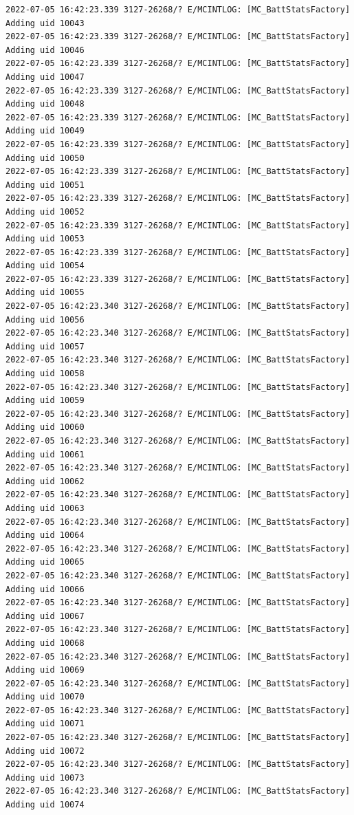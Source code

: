 \documentclass[a4paper,12pt]{book}
\begin{document}
\begin{lstlisting}
2022-07-05 16:42:23.339 3127-26268/? E/MCINTLOG: [MC_BattStatsFactory] Adding uid 10043
2022-07-05 16:42:23.339 3127-26268/? E/MCINTLOG: [MC_BattStatsFactory] Adding uid 10046
2022-07-05 16:42:23.339 3127-26268/? E/MCINTLOG: [MC_BattStatsFactory] Adding uid 10047
2022-07-05 16:42:23.339 3127-26268/? E/MCINTLOG: [MC_BattStatsFactory] Adding uid 10048
2022-07-05 16:42:23.339 3127-26268/? E/MCINTLOG: [MC_BattStatsFactory] Adding uid 10049
2022-07-05 16:42:23.339 3127-26268/? E/MCINTLOG: [MC_BattStatsFactory] Adding uid 10050
2022-07-05 16:42:23.339 3127-26268/? E/MCINTLOG: [MC_BattStatsFactory] Adding uid 10051
2022-07-05 16:42:23.339 3127-26268/? E/MCINTLOG: [MC_BattStatsFactory] Adding uid 10052
2022-07-05 16:42:23.339 3127-26268/? E/MCINTLOG: [MC_BattStatsFactory] Adding uid 10053
2022-07-05 16:42:23.339 3127-26268/? E/MCINTLOG: [MC_BattStatsFactory] Adding uid 10054
2022-07-05 16:42:23.339 3127-26268/? E/MCINTLOG: [MC_BattStatsFactory] Adding uid 10055
2022-07-05 16:42:23.340 3127-26268/? E/MCINTLOG: [MC_BattStatsFactory] Adding uid 10056
2022-07-05 16:42:23.340 3127-26268/? E/MCINTLOG: [MC_BattStatsFactory] Adding uid 10057
2022-07-05 16:42:23.340 3127-26268/? E/MCINTLOG: [MC_BattStatsFactory] Adding uid 10058
2022-07-05 16:42:23.340 3127-26268/? E/MCINTLOG: [MC_BattStatsFactory] Adding uid 10059
2022-07-05 16:42:23.340 3127-26268/? E/MCINTLOG: [MC_BattStatsFactory] Adding uid 10060
2022-07-05 16:42:23.340 3127-26268/? E/MCINTLOG: [MC_BattStatsFactory] Adding uid 10061
2022-07-05 16:42:23.340 3127-26268/? E/MCINTLOG: [MC_BattStatsFactory] Adding uid 10062
2022-07-05 16:42:23.340 3127-26268/? E/MCINTLOG: [MC_BattStatsFactory] Adding uid 10063
2022-07-05 16:42:23.340 3127-26268/? E/MCINTLOG: [MC_BattStatsFactory] Adding uid 10064
2022-07-05 16:42:23.340 3127-26268/? E/MCINTLOG: [MC_BattStatsFactory] Adding uid 10065
2022-07-05 16:42:23.340 3127-26268/? E/MCINTLOG: [MC_BattStatsFactory] Adding uid 10066
2022-07-05 16:42:23.340 3127-26268/? E/MCINTLOG: [MC_BattStatsFactory] Adding uid 10067
2022-07-05 16:42:23.340 3127-26268/? E/MCINTLOG: [MC_BattStatsFactory] Adding uid 10068
2022-07-05 16:42:23.340 3127-26268/? E/MCINTLOG: [MC_BattStatsFactory] Adding uid 10069
2022-07-05 16:42:23.340 3127-26268/? E/MCINTLOG: [MC_BattStatsFactory] Adding uid 10070
2022-07-05 16:42:23.340 3127-26268/? E/MCINTLOG: [MC_BattStatsFactory] Adding uid 10071
2022-07-05 16:42:23.340 3127-26268/? E/MCINTLOG: [MC_BattStatsFactory] Adding uid 10072
2022-07-05 16:42:23.340 3127-26268/? E/MCINTLOG: [MC_BattStatsFactory] Adding uid 10073
2022-07-05 16:42:23.340 3127-26268/? E/MCINTLOG: [MC_BattStatsFactory] Adding uid 10074

\end{lstlisting}
\end{document}
